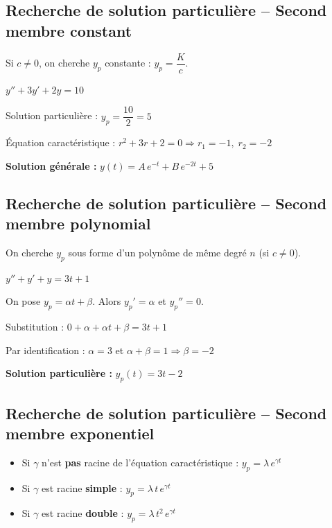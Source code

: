 \documentclass[a4paper,11pt]{article}
\begin{document}
\subsection{Recherche de solution particulière -- Second membre constant}

\begin{methode}[-- $f(t) = K$ (constante)]
Si $c \neq 0$, on cherche $y_p$ constante : $y_p = \dfrac{K}{c}$.
\end{methode}

\begin{exemple}[4]
$y'' + 3y' + 2y = 10$

Solution particulière : $y_p = \dfrac{10}{2} = 5$

Équation caractéristique : $r^2 + 3r + 2 = 0 \Rightarrow r_1 = -1,\; r_2 = -2$

\textbf{Solution générale :} $y(t) = A\,e^{-t} + B\,e^{-2t} + 5$
\end{exemple}

\subsection{Recherche de solution particulière -- Second membre polynomial}

\begin{methode}[-- $f(t) = $ polynôme de degré $n$]
On cherche $y_p$ sous forme d'un polynôme de même degré $n$ (si $c \neq 0$).
\end{methode}

\begin{exemple}[5]
$y'' + y' + y = 3t + 1$

On pose $y_p = \alpha t + \beta$. Alors $y_p' = \alpha$ et $y_p'' = 0$.

Substitution : $0 + \alpha + \alpha t + \beta = 3t + 1$

Par identification : $\alpha = 3$ et $\alpha + \beta = 1 \Rightarrow \beta = -2$

\textbf{Solution particulière :} $y_p(t) = 3t - 2$
\end{exemple}

\subsection{Recherche de solution particulière -- Second membre exponentiel}

\begin{methode}[-- $f(t) = P\,e^{\gamma t}$]
\begin{itemize}
  \item Si $\gamma$ n'est \textbf{pas} racine de l'équation caractéristique : $y_p = \lambda\,e^{\gamma t}$
  \item Si $\gamma$ est racine \textbf{simple} : $y_p = \lambda\,t\,e^{\gamma t}$
  \item Si $\gamma$ est racine \textbf{double} : $y_p = \lambda\,t^2\,e^{\gamma t}$
\end{itemize}
\end{methode}
\end{document}
